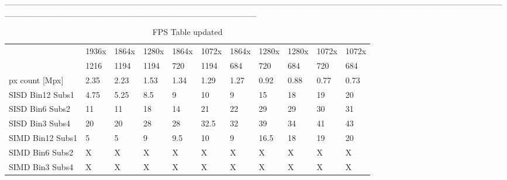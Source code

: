 \documentclass[11pt]{article}
\begin{document}
\_\_\_\_\_\_\_\_\_\_\_\_\_\_\_\_\_\_\_\_\_\_\_\_\_\_\_\_\_\_\_\_\_\_\_\_\_\_\_\_\_\_\_\_\_\_\_\_\_\_\_\_\_\_\_\_\_\_\_\_\_\_\_\_\_\_\_\_\_\_\_\_\_\_\_\_\_\_\_\_\_\_\_\_\_\_\_\_\_\_\_\_\_\_\_\_\_\_\_\_\_\_\_\_\_\_\_\_\_\_\_\_\_\_\_\_\_\_\_\_\_\_

\begin{table}[ht]
    \centering
    
    \caption*{FPS Table updated}
    \begin{tabular}{|l|l|l|l|l|l|l|l|l|l|l|}
        \hline
         & \textsf{1936x} & \textsf{1864x} & \textsf{1280x} & \textsf{1864x} & \textsf{1072x} & \textsf{1864x} & \textsf{1280x} & \textsf{1280x} & \textsf{1072x} & \textsf{1072x} \\
         & \textsf{1216}  & \textsf{1194}  & \textsf{1194}  & \textsf{720}   & \textsf{1194}  & \textsf{684}   & \textsf{720}   & \textsf{684}   & \textsf{720}   & \textsf{684}   \\
        \hline
        px count [Mpx] & 2.35 & 2.23 & 1.53 & 1.34 & 1.29 & 1.27 & 0.92 & 0.88 & 0.77 & 0.73 \\
        \hline
        \hline
        \hline
        SISD Bin12 Subs1 & 4.75  & 5.25  & 8.5   & 9     & 10    & 9     & 15    & 18    & 19    & 20 \\ \hline
        SISD Bin6 Subs2  & 11    & 11    & 18    & 14    & 21    & 22    & 29    & 29    & 30    & 31    \\ \hline
        SISD Bin3 Subs4  & 20    & 20    & 28    & 28    & 32.5  & 32    & 39    & 34    & 41    & 43    \\
        \hline                                                                                                     
        \hline                                                                                                     
        SIMD Bin12 Subs1 & 5     & 5     & 9     & 9.5   & 10    & 9     & 16.5  & 18    & 19    & 20    \\ \hline
        SIMD Bin6 Subs2  & X     & X     & X     & X     & X     & X     & X     & X     & X     & X     \\ \hline
        SIMD Bin3 Subs4  & X     & X     & X     & X     & X     & X     & X     & X     & X     & X     \\

\end{tabular}
\end{table}
\end{document}
